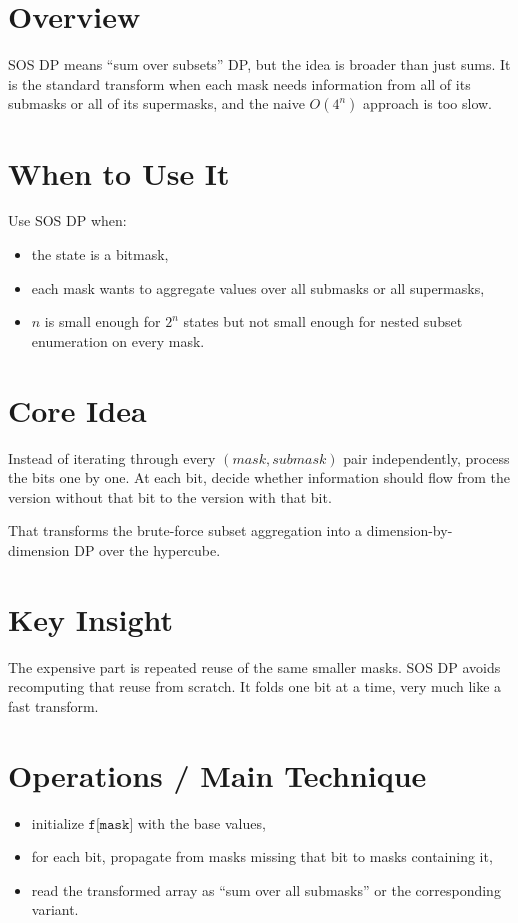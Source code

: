 \section*{Overview}

SOS DP means ``sum over subsets'' DP, but the idea is broader than just sums. It is the standard transform when each
mask needs information from all of its submasks or all of its supermasks, and the naive \(O(4^n)\) approach is too
slow.

\section*{When to Use It}

Use SOS DP when:

\begin{itemize}
  \item the state is a bitmask,
  \item each mask wants to aggregate values over all submasks or all supermasks,
  \item \(n\) is small enough for \(2^n\) states but not small enough for nested subset enumeration on every mask.
\end{itemize}

\section*{Core Idea}

Instead of iterating through every \((mask, submask)\) pair independently, process the bits one by one. At each bit,
decide whether information should flow from the version without that bit to the version with that bit.

That transforms the brute-force subset aggregation into a dimension-by-dimension DP over the hypercube.

\section*{Key Insight}

The expensive part is repeated reuse of the same smaller masks. SOS DP avoids recomputing that reuse from scratch. It
folds one bit at a time, very much like a fast transform.

\section*{Operations / Main Technique}

\begin{itemize}
  \item initialize \(\texttt{f[mask]}\) with the base values,
  \item for each bit, propagate from masks missing that bit to masks containing it,
  \item read the transformed array as ``sum over all submasks'' or the corresponding variant.
\end{itemize}

